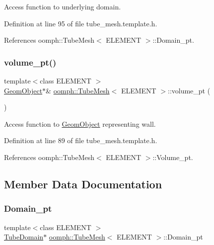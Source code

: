 Access function to underlying domain. 



Definition at line 95 of file tube\+\_\+mesh.\+template.\+h.



References oomph\+::\+Tube\+Mesh$<$ E\+L\+E\+M\+E\+N\+T $>$\+::\+Domain\+\_\+pt.

\mbox{\label{classoomph_1_1TubeMesh_a152971dbd327aaf840fd157bad87d995}} 
\subsubsection{\texorpdfstring{volume\+\_\+pt()}{volume\_pt()}}
{\footnotesize\ttfamily template$<$class E\+L\+E\+M\+E\+NT $>$ \\
\hyperlink{classoomph_1_1GeomObject}{Geom\+Object}$\ast$\& \hyperlink{classoomph_1_1TubeMesh}{oomph\+::\+Tube\+Mesh}$<$ E\+L\+E\+M\+E\+NT $>$\+::volume\+\_\+pt (\begin{DoxyParamCaption}{ }\end{DoxyParamCaption})\hspace{0.3cm}{\ttfamily [inline]}}



Access function to \hyperlink{classoomph_1_1GeomObject}{Geom\+Object} representing wall. 



Definition at line 89 of file tube\+\_\+mesh.\+template.\+h.



References oomph\+::\+Tube\+Mesh$<$ E\+L\+E\+M\+E\+N\+T $>$\+::\+Volume\+\_\+pt.



\subsection{Member Data Documentation}
\mbox{\label{classoomph_1_1TubeMesh_aa40f91e3d55b4ab61304d0b8eca3859f}} 
\subsubsection{\texorpdfstring{Domain\+\_\+pt}{Domain\_pt}}
{\footnotesize\ttfamily template$<$class E\+L\+E\+M\+E\+NT $>$ \\
\hyperlink{classoomph_1_1TubeDomain}{Tube\+Domain}$\ast$ \hyperlink{classoomph_1_1TubeMesh}{oomph\+::\+Tube\+Mesh}$<$ E\+L\+E\+M\+E\+NT $>$\+::Domain\+\_\+pt\hspace{0.3cm}{\ttfamily [protected]}}




